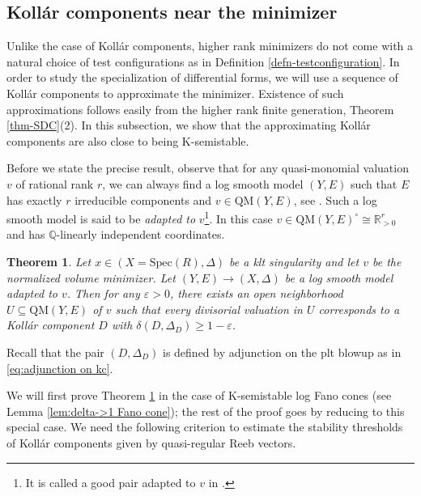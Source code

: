 \documentclass[12pt]{amsart}
\newtheorem{thm}[prop]{Theorem}
\theoremstyle{definition}
\newcommand{\bR}{\mathbb{R}}
\newcommand{\bQ}{\mathbb{Q}}
\newcommand{\Spec}{\mathrm{Spec}}
\newcommand{\QM}{\mathrm{QM}}
\numberwithin{equation}{section}
\begin{document}
\subsection{Koll\'ar components near the minimizer}

Unlike the case of Koll\'ar components, higher rank minimizers do not come with a natural choice of test configurations as in Definition \ref{defn-testconfiguration}. In order to study the specialization of differential forms, we will use a sequence of Koll\'ar components to approximate the minimizer. Existence of such approximations follows easily from the higher rank finite generation, Theorem \ref{thm-SDC}(2). In this subsection, we show that the approximating Koll\'ar components are also close to being K-semistable. %

Before we state the precise result, observe that for any quasi-monomial valuation $v$ of rational rank $r$, we can always find a log smooth model $(Y,E)$ such that $E$ has exactly $r$ irreducible components and $v\in \QM(Y,E)$, see \cite[Lemma 3.6]{JM-val-ideal-seq}. Such a log smooth model is said to be \emph{adapted to} $v$\footnote{It is called a good pair adapted to $v$ in \cite{JM-val-ideal-seq}.}. In this case $v\in \QM(Y,E)^\circ\cong \bR_{> 0}^r$ and has $\bQ$-linearly independent coordinates. 

\begin{thm}\label{thm:delta->1}
Let $x\in (X=\Spec(R),\Delta)$ be a klt singularity and let $v$ be the normalized volume minimizer. Let $(Y,E)\to (X,\Delta)$ be a log smooth model adapted to $v$. Then for any $\varepsilon>0$, there exists an open neighborhood $U\subseteq \QM(Y,E)$ of $v$ such that every divisorial valuation in $U$ corresponds to a Koll\'ar component $D$ with $\delta(D,\Delta_D)\ge 1-\varepsilon$.
\end{thm}

Recall that the pair $(D,\Delta_D)$ is defined by adjunction on the plt blowup as in \eqref{eq:adjunction on kc}.

We will first prove Theorem \ref{thm:delta->1} in the case of K-semistable log Fano cones (see Lemma \ref{lem:delta->1 Fano cone}); the rest of the proof goes by reducing to this special case. We need the following criterion to estimate the stability thresholds of Koll\'ar components given by quasi-regular Reeb vectors.
\end{document}
